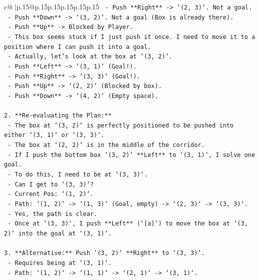 \documentclass{article}
\begin{document}
{\begin{supertabular}{c@{$\;$}|p{.15\linewidth}@{}p{.15\linewidth}p{.15\linewidth}p{.15\linewidth}p{.15\linewidth}p{.15\linewidth}}
{{{\texttt{        {-}   Push **Right** {-}> `(2, 3)`. Not a goal.} \\
\texttt{        {-}   Push **Down** {-}> `(3, 2)`. Not a goal (Box is already there).} \\
\texttt{        {-}   Push **Up** {-}> Blocked by Player.} \\
\texttt{    {-}   This box seems stuck if I just push it once. I need to move it to a position where I can push it into a goal.} \\
\texttt{    {-}   Actually, let's look at the box at `(3, 2)`.} \\
\texttt{        {-}   Push **Left** {-}> `(3, 1)` (Goal!).} \\
\texttt{        {-}   Push **Right** {-}> `(3, 3)` (Goal!).} \\
\texttt{        {-}   Push **Up** {-}> `(2, 2)` (Blocked by box).} \\
\texttt{        {-}   Push **Down** {-}> `(4, 2)` (Empty space).} \\
\\ 
\texttt{2.  **Re{-}evaluating the Plan:**} \\
\texttt{    {-}   The box at `(3, 2)` is perfectly positioned to be pushed into either `(3, 1)` or `(3, 3)`.} \\
\texttt{    {-}   The box at `(2, 2)` is in the middle of the corridor.} \\
\texttt{    {-}   If I push the bottom box `(3, 2)` **Left** to `(3, 1)`, I solve one goal.} \\
\texttt{    {-}   To do this, I need to be at `(3, 3)`.} \\
\texttt{    {-}   Can I get to `(3, 3)`?} \\
\texttt{        {-}   Current Pos: `(1, 2)`.} \\
\texttt{        {-}   Path: `(1, 2)` {-}> `(1, 3)` (Goal, empty) {-}> `(2, 3)` {-}> `(3, 3)`.} \\
\texttt{        {-}   Yes, the path is clear.} \\
\texttt{    {-}   Once at `(3, 3)`, I push **Left** (`{[}a{]}`) to move the box at `(3, 2)` into the goal at `(3, 1)`.} \\
\\ 
\texttt{3.  **Alternative:** Push `(3, 2)` **Right** to `(3, 3)`.} \\
\texttt{    {-}   Requires being at `(3, 1)`.} \\
\texttt{    {-}   Path: `(1, 2)` {-}> `(1, 1)` {-}> `(2, 1)` {-}> `(3, 1)`.} \\
}}}
\end{supertabular}}
\end{document}
